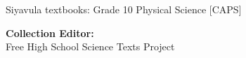     \begin{center}
    \thispagestyle{empty}

    \vspace*{2in}

    {
    {\Huge Siyavula textbooks: Grade 10 Physical Science [CAPS]}
    \vspace*{1in}
    \\

    
        {\Large \textbf{Collection Editor:}\vspace{1mm}\\
        
          \indent 
	  Free High School Science Texts Project
	\\
        
        \vspace{3mm}
      

    \vfill

    }}
    \end{center}

    
    \newpage
    \thispagestyle{empty}
  

